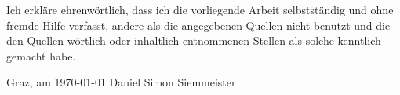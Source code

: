 Ich erkläre ehrenwörtlich, dass ich die vorliegende Arbeit selbstständig und ohne
fremde Hilfe verfasst, andere als die angegebenen Quellen nicht benutzt und die den
Quellen wörtlich oder inhaltlich entnommenen Stellen als solche kenntlich gemacht
habe. 

Graz, am \today{} \hfill Daniel Simon Siemmeister